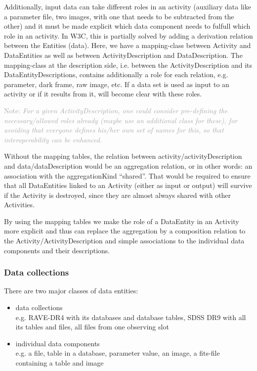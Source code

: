 \documentclass[11pt,a4paper]{ivoa}
\newcommand{\Note}[1]{%
    \noindent%
    \textcolor{darkgrey}{{\sffamily Note:} \emph{#1}}%
}
\begin{document}
Additionally, input data can take different roles in an activity (auxiliary data like a parameter file, two images, with one that needs to be subtracted from the other) and it must be made explicit which data component needs to fulfull which role in an activity. 
In W3C, this is partially solved by adding a derivation relation between the Entities (data). Here, we have a mapping-class between Activity and DataEntities as well as between ActivityDescription and DataDescription. The mapping-class at the description side, i.e. between the ActivityDescription and its DataEntityDescriptions, contains additionally a role for each relation, e.g. parameter, dark frame, raw image, etc.  If a data set is used as input to an activity or if it results from it, will become clear with these roles.

\Note{For a given ActivityDescription, one could consider pre-defining the necessary/allowed roles already (maybe use an additional class for these), for avoiding that everyone defines his/her own set 
of names for this, so that interoperability can be enhanced.}

Without the mapping tables, the relation between activity/activityDescription and data/dataDescription would be an aggregation relation, or in other words: an association with the aggregationKind ``shared''. That would be required to ensure that all DataEntities linked to an Activity (either as input or output) will survive if the Activity is destroyed, since they are almost always shared with other Activities. 

By using the mapping tables we make the role of a DataEntity in an Activity more explicit and thus can replace the aggregation by a composition relation to the Activity/ActivityDescription and simple associations to the individual data components and their descriptions. 


\subsubsection{Data collections}

There are two major classes of data entities: 

\begin{itemize} 
\item data collections \\e.g. RAVE-DR4 with its databases and database tables, SDSS DR9 with 
all its tables and files, all files from one observing slot\\

\item individual data components\\
e.g. a file, table in a database, parameter value, an image, a fits-file containing a table and image

\end{itemize}
\end{document}
